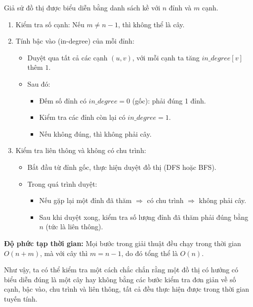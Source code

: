\documentclass{article}
\begin{document}
	Giả sử đồ thị được biểu diễn bằng danh sách kề với $n$ đỉnh và $m$ cạnh.
	
	\begin{enumerate}
		\item Kiểm tra số cạnh: Nếu $m \ne n - 1$, thì không thể là cây.
		
		\item Tính bậc vào (in-degree) của mỗi đỉnh:
		\begin{itemize}
			\item Duyệt qua tất cả các cạnh $(u, v)$, với mỗi cạnh ta tăng $in\_degree[v]$ thêm $1$.
			\item Sau đó:
			\begin{itemize}
				\item Đếm số đỉnh có $in\_degree = 0$ (gốc): phải đúng 1 đỉnh.
				\item Kiểm tra các đỉnh còn lại có $in\_degree = 1$.
				\item Nếu không đúng, thì không phải cây.
			\end{itemize}
		\end{itemize}
		
		\item Kiểm tra liên thông và không có chu trình:
		\begin{itemize}
			\item Bắt đầu từ đỉnh gốc, thực hiện duyệt đồ thị (DFS hoặc BFS).
			\item Trong quá trình duyệt:
			\begin{itemize}
				\item Nếu gặp lại một đỉnh đã thăm $\Rightarrow$ có chu trình $\Rightarrow$ không phải cây.
				\item Sau khi duyệt xong, kiểm tra số lượng đỉnh đã thăm phải đúng bằng $n$ (tức là liên thông).
			\end{itemize}
		\end{itemize}
	\end{enumerate}
	
	\vspace{1em}
	\textbf{Độ phức tạp thời gian:} Mọi bước trong giải thuật đều chạy trong thời gian $O(n + m)$, mà với cây thì $m = n - 1$, do đó tổng thể là $O(n)$.
	
	\vspace{1em}
	Như vậy, ta có thể kiểm tra một cách chắc chắn rằng một đồ thị có hướng có biểu diễn đúng là một cây hay không bằng các bước kiểm tra đơn giản về số cạnh, bậc vào, chu trình và liên thông, tất cả đều thực hiện được trong thời gian tuyến tính.
	
\end{document}
